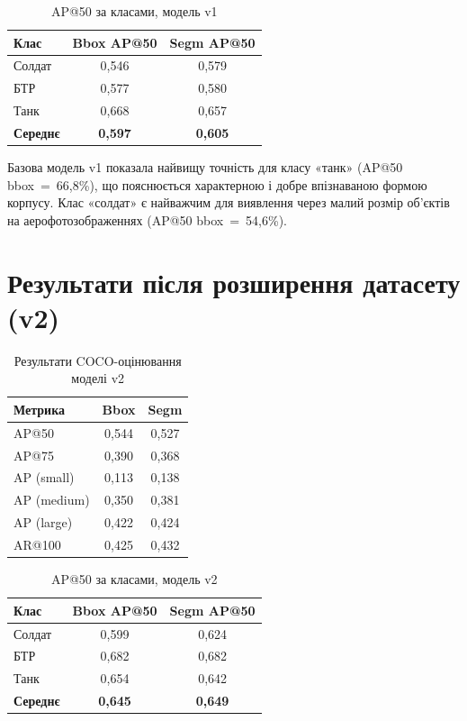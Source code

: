 \documentclass[14pt,a4paper]{extreport}
\begin{document}
\begin{table}[H]
\caption{AP@50 за класами, модель v1}
\label{tab:cls_v1}
\centering
\begin{tabular}{@{}lcc@{}}
\toprule
Клас & Bbox AP@50 & Segm AP@50 \\
\midrule
Солдат & 0{,}546 & 0{,}579 \\
БТР    & 0{,}577 & 0{,}580 \\
Танк   & 0{,}668 & 0{,}657 \\
\midrule
\textbf{Середнє} & \textbf{0{,}597} & \textbf{0{,}605} \\
\bottomrule
\end{tabular}
\end{table}

Базова модель v1 показала найвищу точність для класу «танк» (AP@50
bbox~=~66{,}8\%), що пояснюється характерною і добре впізнаваною формою
корпусу. Клас «солдат» є найважчим для виявлення через малий розмір
об'єктів на аерофотозображеннях (AP@50 bbox~=~54{,}6\%).

\section{Результати після розширення датасету (v2)}

\begin{table}[H]
\caption{Результати COCO-оцінювання моделі v2}
\label{tab:coco_v2}
\centering
\begin{tabular}{@{}lcc@{}}
\toprule
Метрика & Bbox & Segm \\
\midrule
AP@50   & 0{,}544 & 0{,}527 \\
AP@75   & 0{,}390 & 0{,}368 \\
AP (small)  & 0{,}113 & 0{,}138 \\
AP (medium) & 0{,}350 & 0{,}381 \\
AP (large)  & 0{,}422 & 0{,}424 \\
AR@100  & 0{,}425 & 0{,}432 \\
\bottomrule
\end{tabular}
\end{table}

\begin{table}[H]
\caption{AP@50 за класами, модель v2}
\label{tab:cls_v2}
\centering
\begin{tabular}{@{}lcc@{}}
\toprule
Клас & Bbox AP@50 & Segm AP@50 \\
\midrule
Солдат & 0{,}599 & 0{,}624 \\
БТР    & 0{,}682 & 0{,}682 \\
Танк   & 0{,}654 & 0{,}642 \\
\midrule
\textbf{Середнє} & \textbf{0{,}645} & \textbf{0{,}649} \\
\bottomrule
\end{tabular}
\end{table}
\end{document}
